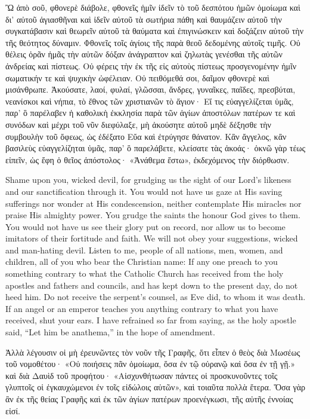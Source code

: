 \documentclass[10pt]{book}
\newcommand{\switchGreek}[1][]{\selectlanguage{polutonikogreek} \switchcolumn*[#1]}
\newcommand{\switchEnglish}{\selectlanguage{english} \switchcolumn}
\begin{document}
\begin{paracol}{2}
\switchGreek

Ὢ ἀπὸ σοῦ, φθονερὲ διάβολε, φθονεῖς ἡμῖν ἰδεῖν τὸ τοῦ δεσπότου ἡμῶν ὁμοίωμα
καὶ δι’ αὐτοῦ ἁγιασθῆναι καὶ ἰδεῖν αὐτοῦ τὰ σωτήρια πάθη καὶ θαυμάζειν αὐτοῦ
τὴν συγκατάβασιν καὶ θεωρεῖν αὐτοῦ τὰ θαύματα καὶ ἐπιγινώσκειν καὶ δοξάζειν
αὐτοῦ τὴν τῆς θεότητος δύναμιν. Φθονεῖς τοῖς ἁγίοις τῆς παρὰ θεοῦ δεδομένης
αὐτοῖς τιμῆς. Οὐ θέλεις ὁρᾶν ἡμᾶς τὴν αὐτῶν δόξαν ἀνάγραπτον καὶ ζηλωτὰς
γενέσθαι τῆς αὐτῶν ἀνδρείας καὶ πίστεως. Οὐ φέρεις τὴν ἐκ τῆς εἰς αὐτοὺς
πίστεως προσγενομένην ἡμῖν σωματικήν τε καὶ ψυχικὴν ὠφέλειαν. Οὐ πειθόμεθά
σοι, δαῖμον φθονερὲ καὶ μισάνθρωπε. Ἀκούσατε, λαοί, φυλαί, γλῶσσαι, ἄνδρες,
γυναῖκες, παῖδες, πρεσβύται, νεανίσκοι καὶ νήπια, τὸ ἔθνος τῶν χριστιανῶν τὸ
ἅγιον· Εἴ τις εὐαγγελίζεται ὑμᾶς, παρ’ ὃ παρέλαβεν ἡ καθολικὴ ἐκκλησία παρὰ
τῶν ἁγίων ἀποστόλων πατέρων τε καὶ συνόδων καὶ μέχρι τοῦ νῦν διεφύλαξε, μὴ
ἀκούσητε αὐτοῦ μηδὲ δέξησθε τὴν συμβουλὴν τοῦ ὄφεως, ὡς ἐδέξατο Εὔα καὶ
ἐτρύγησε θάνατον. Κἂν ἄγγελος, κἂν βασιλεὺς εὐαγγελίζηται ὑμᾶς, παρ’ ὃ
παρελάβετε, κλείσατε τὰς ἀκοάς· ὀκνῶ γὰρ τέως εἰπεῖν, ὡς ἔφη ὁ θεῖος
ἀπόστολος· «Ἀνάθεμα ἔστω», ἐκδεχόμενος τὴν διόρθωσιν.

\switchEnglish

Shame upon you, wicked devil, for grudging 
us the sight of our Lord's likeness and our 
sanctification through it. You would not have 
us gaze at His saving sufferings nor wonder 
at His condescension, neither contemplate His 
miracles nor praise His almighty power. You 
grudge the saints the honour God gives to 
them. You would not have us see their glory 
put on record, nor allow us to become imitators 
of their fortitude and faith. We will not 
obey your suggestions, wicked and man-hating 
devil. Listen to me, people of all nations, 
men, women, and children, all of you who bear 
the Christian name: If any one preach to 
you something contrary to what the Catholic 
Church has received from the holy apostles 
and fathers and councils, and has kept down 
to the present day, do not heed him. Do not 
receive the serpent's counsel, as Eve did, to 
whom it was death. If an angel or an 
emperor teaches you anything contrary to 
what you have received, shut your ears. I 
have refrained so far from saying, as the holy 
apostle said, ``Let him be anathema,'' in the 
hope of amendment. 

\switchGreek

Ἀλλὰ λέγουσιν οἱ μὴ ἐρευνῶντες τὸν νοῦν τῆς Γραφῆς, ὅτι εἶπεν ὁ θεὸς διὰ
Μωσέως τοῦ νομοθέτου· «Οὐ ποιήσεις πᾶν ὁμοίωμα, ὅσα ἐν τῷ οὐρανῷ καὶ ὅσα ἐν
τῇ γῇ.» καὶ διὰ Δαυὶδ τοῦ προφήτου· «Αἰσχυνθήτωσαν πάντες οἱ προσκυνοῦντες
τοῖς γλυπτοῖς οἱ ἐγκαυχώμενοι ἐν τοῖς εἰδώλοις αὐτῶν», καὶ τοιαῦτα πολλὰ
ἕτερα. Ὅσα γὰρ ἂν ἐκ τῆς θείας Γραφῆς καὶ ἐκ τῶν ἁγίων πατέρων προενέγκωσι,
τῆς αὐτῆς ἐννοίας εἰσί.


\end{paracol}
\end{document}
